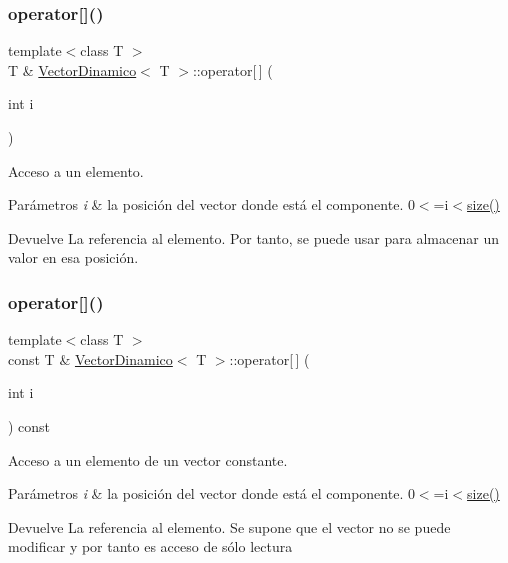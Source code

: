\subsubsection{\texorpdfstring{operator[]()}{operator[]()}\hspace{0.1cm}{\footnotesize\ttfamily [1/2]}}
{\footnotesize\ttfamily template$<$class T $>$ \\
T \& \hyperlink{classVectorDinamico}{Vector\+Dinamico}$<$ T $>$\+::operator\mbox{[}$\,$\mbox{]} (\begin{DoxyParamCaption}\item[{int}]{i }\end{DoxyParamCaption})}



Acceso a un elemento. 


\begin{DoxyParams}{Parámetros}
{\em i} & la posición del vector donde está el componente. 0$<$=i$<$\hyperlink{classVectorDinamico_a170abdfac52375020f44bc3903f23b65}{size()} \\
\hline
\end{DoxyParams}
\begin{DoxyReturn}{Devuelve}
La referencia al elemento. Por tanto, se puede usar para almacenar un valor en esa posición. 
\end{DoxyReturn}
\mbox{\label{classVectorDinamico_ad078d3fb05f126632fd8fe995fae2a74}} 
\subsubsection{\texorpdfstring{operator[]()}{operator[]()}\hspace{0.1cm}{\footnotesize\ttfamily [2/2]}}
{\footnotesize\ttfamily template$<$class T $>$ \\
const T \& \hyperlink{classVectorDinamico}{Vector\+Dinamico}$<$ T $>$\+::operator\mbox{[}$\,$\mbox{]} (\begin{DoxyParamCaption}\item[{int}]{i }\end{DoxyParamCaption}) const}



Acceso a un elemento de un vector constante. 


\begin{DoxyParams}{Parámetros}
{\em i} & la posición del vector donde está el componente. 0$<$=i$<$\hyperlink{classVectorDinamico_a170abdfac52375020f44bc3903f23b65}{size()} \\
\hline
\end{DoxyParams}
\begin{DoxyReturn}{Devuelve}
La referencia al elemento. Se supone que el vector no se puede modificar y por tanto es acceso de sólo lectura 
\end{DoxyReturn}
\mbox{\label{classVectorDinamico_a2680351f2cd4feba8825c6f1f04a6392}} 
